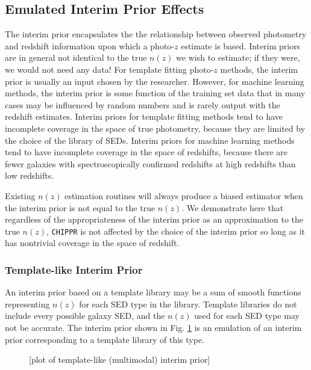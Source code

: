 \documentclass[iop]{emulateapj}
\newcommand{\chippr}{\texttt{CHIPPR} }
\begin{document}
\subsection{Emulated Interim Prior Effects}
\label{sec:priors}

The interim prior encapsulates the the relationship between observed photometry and redshift information upon which a photo-$z$ estimate is based.  Interim priors are in general not identical to the true $n(z)$ we wish to estimate; if they were, we would not need any data!  For template fitting photo-$z$ methods, the interim prior is usually an input chosen by the researcher.  However, for machine learning methods, the interim prior is some function of the training set data that in many cases may be influenced by random numbers and is rarely output with the redshift estimates.  Interim priors for template fitting methods tend to have incomplete coverage in the space of true photometry, because they are limited by the choice of the library of SEDs.  Interim priors for machine learning methods tend to have incomplete coverage in the space of redshifts, because there are fewer galaxies with spectroscopically confirmed redshifts at high redshifts than low redshifts.

Existing $n(z)$ estimation routines will always produce a biased estimator when the interim prior is not equal to the true $n(z)$.  We demonstrate here that regardless of the appropriateness of the interim prior as an approximation to the true $n(z)$, \chippr is not affected by the choice of the interim prior so long as it has nontrivial coverage in the space of redshift.

\subsubsection{Template-like Interim Prior}
\label{sec:tempintpr}

An interim prior based on a template library may be a sum of smooth functions representing $n(z)$ for each SED type in the library.  Template libraries do not include every possible galaxy SED, and the $n(z)$ used for each SED type may not be accurate.  The interim prior shown in Fig. \ref{fig:tempintpr} is an emulation of an interim prior corresponding to a template library of this type.

\begin{figure}
	\begin{center}
		\caption{[plot of template-like (multimodal) interim prior]}
		\label{fig:tempintpr}
	\end{center}
\end{figure}
\end{document}
